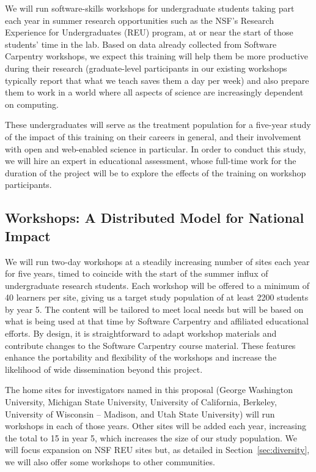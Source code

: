 \documentclass{proposalnsf}
\begin{document}
We will run software-skills workshops for undergraduate students
taking part each year in summer research opportunities such as the
NSF's Research Experience for Undergraduates (REU) program, at or near
the start of those students' time in the lab.  Based on data already
collected from Software Carpentry workshops, we expect this training
will help them be more productive during their research (graduate-level
participants in our existing workshops typically report that what we
teach saves them a day per week) and also prepare them to work in a
world where all aspects of science are increasingly dependent on
computing.

These undergraduates will serve as the treatment population for a
five-year study of the impact of this training on their careers in
general, and their involvement with open and web-enabled science in
particular.  In order to conduct this study, we will hire an expert in
educational assessment, whose full-time work for the duration of the
project will be to explore the effects of the training on workshop
participants.

\subsection{Workshops: A Distributed Model for National Impact}

We will run two-day workshops at a steadily increasing number of sites
each year for five years, timed to coincide with the start of the
summer influx of undergraduate research students.  Each workshop will
be offered to a minimum of 40 learners per site, giving us a target
study population of at least 2200 students by year 5.  The content will be
tailored to meet local needs but will be based on what is being used
at that time by Software Carpentry and affiliated educational efforts.
By design, it is straightforward to adapt workshop materials and
contribute changes to the Software Carpentry course material.  These
features enhance the portability and flexibility of the workshops and
increase the likelihood of wide dissemination beyond this project.

The home sites for investigators named in this proposal (George
Washington University, Michigan State University, University of
California, Berkeley, University of Wisconsin -- Madison, and
Utah State University) will run workshops in each of those years.
Other sites will be added each year, increasing the total to 15 in
year 5, which increases the size of our study population.  We will
focus expansion on NSF REU sites \cite{nsfreu} but, as detailed in
Section~\ref{sec:diversity}, we will also offer some workshops to
other communities.
\end{document}
